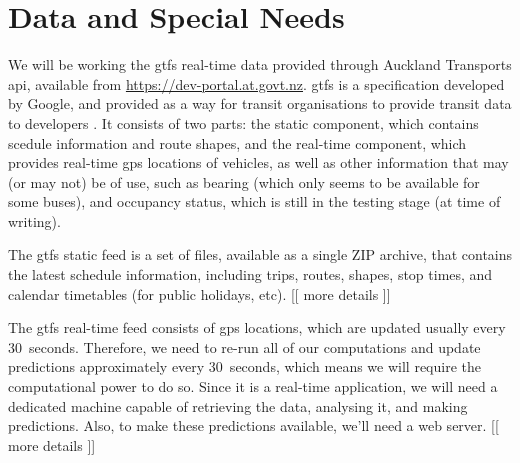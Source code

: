 \documentclass[12pt,a4paper]{article}
\begin{document}




\section{Data and Special Needs}
\label{sec:data}

We will be working the \gls{gtfs} real-time data provided through Auckland Transports
\gls{api}, available from \url{https://dev-portal.at.govt.nz}.
\gls{gtfs} is a specification developed by Google, 
and provided as a way for transit organisations to provide transit data to developers
\citep{gtfs}. 
It consists of two parts: the static component, which contains scedule information and route shapes,
and the real-time component, which provides real-time \gls{gps} locations of vehicles,
as well as other information that may (or may not) be of use,
such as bearing (which only seems to be available for some buses),
and occupancy status, which is still in the testing stage (at time of writing).


The \gls{gtfs} static feed is a set of files, available as a single ZIP archive, 
that contains the latest schedule information, including trips, routes, shapes, stop times,
and calendar timetables (for public holidays, etc).
[[ more details ]]


The \gls{gtfs} real-time feed consists of \gls{gps} locations,
which are updated usually every 30~seconds.
Therefore, we need to re-run all of our computations and update predictions approximately
every 30~seconds, which means we will require the computational power to do so.
Since it is a real-time application, we will need a dedicated machine capable of
retrieving the data, analysing it, and making predictions.
Also, to make these predictions available, we'll need a web server.
[[ more details ]]
\end{document}
